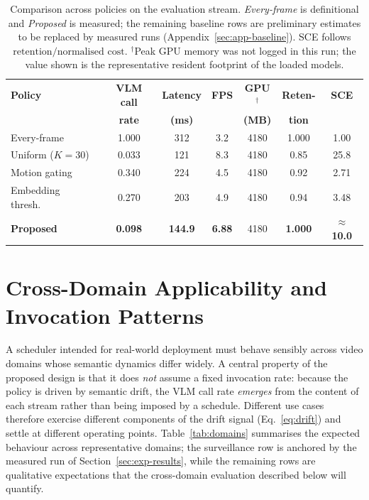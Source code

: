 \begin{table}[htbp]
\centering
\caption[Main quantitative comparison]{Comparison across policies on the
evaluation stream. \emph{Every-frame} is definitional and \emph{Proposed} is
measured; the remaining baseline rows are preliminary estimates to be replaced
by measured runs (Appendix~\ref{sec:app-baseline}). SCE follows
$\text{retention}/\text{normalised cost}$. $^{\dagger}$Peak GPU memory was not
logged in this run; the value shown is the representative resident footprint of
the loaded models.}
\label{tab:main-results}
\small
\begin{tabular}{@{}lcccccc@{}}
\toprule
\textbf{Policy} & \textbf{VLM call} & \textbf{Latency} & \textbf{FPS} & \textbf{GPU}$^{\dagger}$ & \textbf{Reten-} & \textbf{SCE} \\
 & \textbf{rate} & \textbf{(ms)} & & \textbf{(MB)} & \textbf{tion} & \\
\midrule
Every-frame         & 1.000 & 312 & 3.2 & 4180 & 1.000 & 1.00 \\
Uniform ($K{=}30$)  & 0.033 & 121 & 8.3 & 4180 & 0.85 & 25.8 \\
Motion gating       & 0.340 & 224 & 4.5 & 4180 & 0.92 & 2.71 \\
Embedding thresh.\  & 0.270 & 203 & 4.9 & 4180 & 0.94 & 3.48 \\
\textbf{Proposed}   & \textbf{0.098} & \textbf{144.9} & \textbf{6.88} & 4180 & \textbf{1.000} & \textbf{$\approx$10.0} \\
\bottomrule
\end{tabular}
\end{table}

\section{Cross-Domain Applicability and Invocation Patterns}
\label{sec:exp-crossdomain}

A scheduler intended for real-world deployment must behave sensibly across
video domains whose semantic dynamics differ widely. A central property of the
proposed design is that it does \emph{not} assume a fixed invocation rate:
because the policy is driven by semantic drift, the VLM call rate
\emph{emerges} from the content of each stream rather than being imposed by a
schedule. Different use cases therefore exercise different components of the
drift signal (Eq.~\ref{eq:drift}) and settle at different operating points.
Table~\ref{tab:domains} summarises the expected behaviour across representative
domains; the surveillance row is anchored by the measured run of
Section~\ref{sec:exp-results}, while the remaining rows are qualitative
expectations that the cross-domain evaluation described below will quantify.

